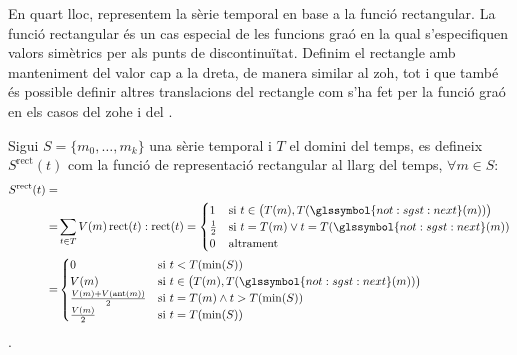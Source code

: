 En quart lloc, representem la sèrie temporal en base a la funció
rectangular. La funció rectangular és un cas especial de les funcions
graó en la qual s'especifiquen valors simètrics per als punts de
discontinuïtat. Definim el rectangle amb manteniment del valor cap a
la dreta, de manera similar al \gls{zoh}, tot i que també és possible
definir altres translacions del rectangle com s'ha fet per la funció
graó en els casos del \gls{zohe} i del .
\begin{definition}
  Sigui $S=\{m_0,\ldots,m_k\}$ una sèrie temporal i $T$ el domini del
  temps, es defineix $S^\text{rect}(t)$ com la funció de representació
  rectangular al llarg del temps, $\forall m \in S:$
  \begin{align*}
    S^\text{rect}(t) = &  \\
    = & \sum_{t\in T} V(m) \operatorname{rect}(t):  \operatorname{rect}(t) = 
    \begin{cases}
      1 & \text{si } t\in \big(T(m),T(\glssymbol{not:sgst:next}(m))\big) \\
      \frac{1}{2}& \text{si } t = T(m) \vee t=T(\glssymbol{not:sgst:next}(m)) \\
      0 & \text{altrament}
    \end{cases} \\
    = & \begin{cases}
      0 & \text{si }  t<T(\min(S)) \\
      V(m) & \text{si } t\in \big(T(m),T(\glssymbol{not:sgst:next}(m))\big) \\
      \frac{V(m)+V(\ant(m))}{2} & \text{si } t = T(m) \wedge t > T(\min(S)) \\
      \frac{V(m)}{2} & \text{si } t = T(\min(S)) \\
    \end{cases}
         \end{align*}.
\end{definition}




